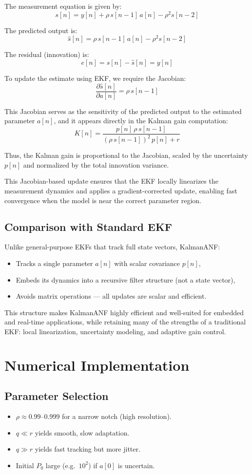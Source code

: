 \documentclass{article}
\begin{document}
The measurement equation is given by:
\[
s[n] = y[n] + \rho\,s[n-1]\,a[n] - \rho^2 s[n-2]
\]

The predicted output is:
\[
\hat{s}[n] = \rho\,s[n-1]\,a[n] - \rho^2 s[n-2]
\]

The residual (innovation) is:
\[
e[n] = s[n] - \hat{s}[n] = y[n]
\]

To update the estimate using EKF, we require the Jacobian:
\[
\frac{\partial \hat{s}[n]}{\partial a[n]} = \rho\,s[n-1]
\]

This Jacobian serves as the sensitivity of the predicted output to the estimated parameter \( a[n] \), and it appears directly in the Kalman gain computation:
\[
K[n] = \frac{p[n]\,\rho\,s[n-1]}{(\rho\,s[n-1])^2\,p[n] + r}
\]

Thus, the Kalman gain is proportional to the Jacobian, scaled by the uncertainty \( p[n] \) and normalized by the total innovation variance.

This Jacobian-based update ensures that the EKF locally linearizes the measurement dynamics and applies a gradient-corrected update, enabling fast convergence when the model is near the correct parameter region.

\subsection{Comparison with Standard EKF}

Unlike general-purpose EKFs that track full state vectors, KalmanANF:
\begin{itemize}
    \item Tracks a single parameter \( a[n] \) with scalar covariance \( p[n] \),
    \item Embeds its dynamics into a recursive filter structure (not a state vector),
    \item Avoids matrix operations — all updates are scalar and efficient.
\end{itemize}

This structure makes KalmanANF highly efficient and well-suited for embedded and real-time applications, while retaining many of the strengths of a traditional EKF: local linearization, uncertainty modeling, and adaptive gain control.

\section{Numerical Implementation}

\subsection{Parameter Selection}
\begin{itemize}
  \item \(\rho\approx0.99\)–0.999 for a narrow notch (high resolution).  
  \item \(q\ll r\) yields smooth, slow adaptation.  
  \item \(q\gg r\) yields fast tracking but more jitter.  
  \item Initial \(P_0\) large (e.g.\ \(10^2\)) if \(a[0]\) is uncertain.  
\end{itemize}
\end{document}
